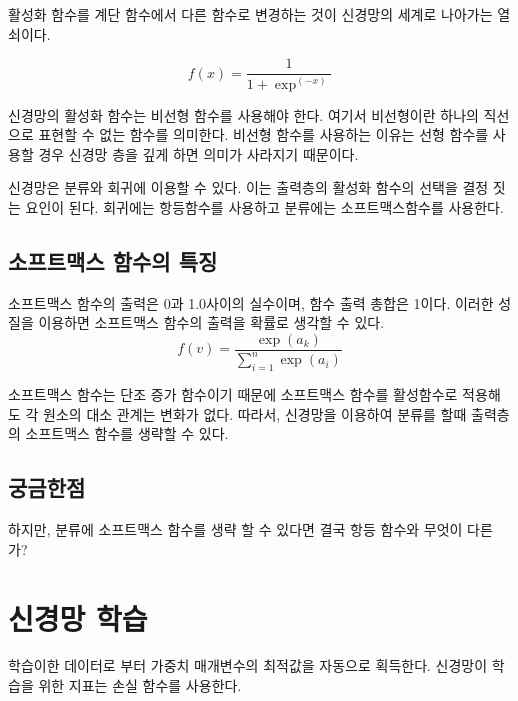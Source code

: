 \documentclass[12pt]{article}
\begin{document}
	활성화 함수를 계단 함수에서 다른 함수로 변경하는 것이 신경망의 세계로 나아가는 열쇠이다.
	
	\[ f(x)=\frac{1}{1+\exp^(-x)}	\]
	
	신경망의 활성화 함수는 비선형 함수를 사용해야 한다. 여기서 비선형이란 하나의 직선으로 표현할 수 없는 함수를 의미한다.
	비선형 함수를 사용하는 이유는 선형 함수를 사용할 경우 신경망 층을 깊게 하면 의미가 사라지기 때문이다.
	
	신경망은 분류와 회귀에 이용할 수 있다. 이는 출력층의 활성화 함수의 선택을 결정 짓는 요인이 된다. 회귀에는 항등함수를 사용하고 분류에는 소프트맥스함수를 사용한다.
	
	\subsection{소프트맥스 함수의 특징}
	소프트맥스 함수의 출력은 0과 1.0사이의 실수이며, 함수 출력 총합은 1이다.
	이러한 성질을 이용하면 소프트맥스 함수의 출력을 확률로 생각할 수 있다.
	\[ f(v) = \frac{\exp(a_{k})} {\sum_{i=1}^{n}  {\exp(a_{i})}} \]
	
	소프트맥스 함수는 단조 증가 함수이기 때문에 소프트맥스 함수를 활성함수로 적용해도 각 원소의 대소 관계는 변화가 없다. 따라서, 신경망을 이용하여 분류를 할때 출력층의 소프트맥스 함수를 생략할 수 있다.
	
	\subsection{궁금한점}
	하지만, 분류에 소프트맥스 함수를 생략 할 수 있다면 결국 항등 함수와 무엇이 다른가?
	\clearpage
	
\section{신경망 학습}
학습이한 데이터로 부터 가중치 매개변수의 최적값을 자동으로 획득한다.
신경망이 학습을 위한 지표는 손실 함수를 사용한다.
\end{document}
